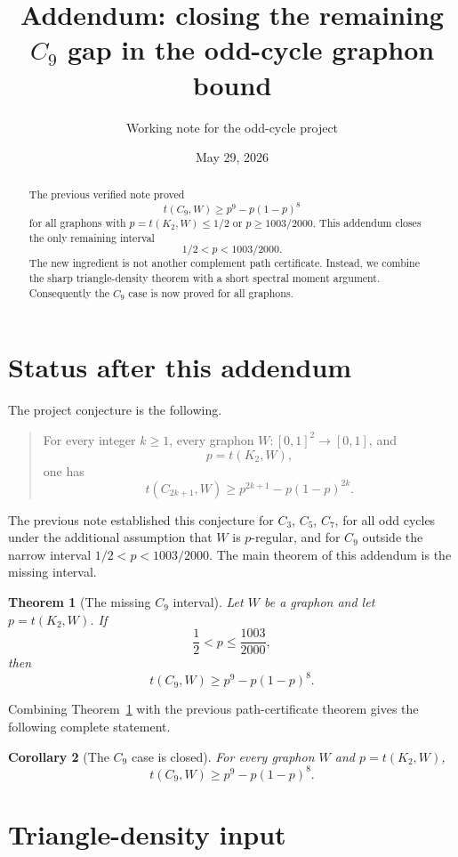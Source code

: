 \documentclass[11pt]{article}
\title{Addendum: closing the remaining $C_9$ gap in the odd-cycle graphon bound}
\author{Working note for the odd-cycle project}
\date{May 29, 2026}
\newtheorem{theorem}{Theorem}[section]
\newtheorem{corollary}[theorem]{Corollary}
\begin{document}
\maketitle

\begin{abstract}
The previous verified note proved
\[
        t(C_9,W)\ge p^9-p(1-p)^8
\]
for all graphons with $p=t(K_2,W)\le1/2$ or $p\ge1003/2000$.  This addendum closes the only remaining interval
\[
        1/2<p<1003/2000.
\]
The new ingredient is not another complement path certificate.  Instead, we combine the sharp triangle-density theorem with a short spectral moment argument.  Consequently the $C_9$ case is now proved for all graphons.
\end{abstract}

\section{Status after this addendum}

The project conjecture is the following.

\begin{quote}
For every integer $k\ge1$, every graphon $W\colon[0,1]^2\to[0,1]$, and
\[
        p=t(K_2,W),
\]
one has
\[
        t(C_{2k+1},W)\ge p^{2k+1}-p(1-p)^{2k}.
\]
\end{quote}

The previous note established this conjecture for $C_3$, $C_5$, $C_7$, for all odd cycles under the additional assumption that $W$ is $p$-regular, and for $C_9$ outside the narrow interval $1/2<p<1003/2000$.  The main theorem of this addendum is the missing interval.

\begin{theorem}[The missing $C_9$ interval]\label{thm:gap}
Let $W$ be a graphon and let $p=t(K_2,W)$.  If
\[
        \frac12<p\le \frac{1003}{2000},
\]
then
\[
        t(C_9,W)\ge p^9-p(1-p)^8.
\]
\end{theorem}

Combining Theorem~\ref{thm:gap} with the previous path-certificate theorem gives the following complete statement.

\begin{corollary}[The $C_9$ case is closed]\label{cor:C9}
For every graphon $W$ and $p=t(K_2,W)$,
\[
        t(C_9,W)\ge p^9-p(1-p)^8.
\]
\end{corollary}

\section{Triangle-density input}
\end{document}
